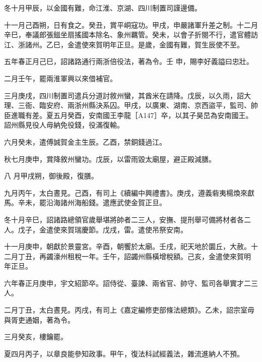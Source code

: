 \begin{pinyinscope}
 冬十月甲辰，以金國有難，命江淮、京湖、四川制置司謹邊備。



 十一月己酉朔，日有食之。癸丑，賞平峒寇功。甲戌，申嚴諸軍升差之制。十二月辛巳，奉議郎張鎡坐扇搖國本除名、象州羈管。癸未，以會子折閱不行，遣官體訪江、浙諸州。乙巳，金遣使來賀明年正旦。是歲，金國有難，賀生辰使不至。



 五年春正月己巳，詔諸路通行兩浙倍役法，著為令。壬
 申，賜李好義謚曰忠壯。



 二月壬午，罷兩淮軍興以來借補官。



 三月庚戌，四川制置司遣兵分道討敘州蠻，其酋米在請降。戊辰，以久雨，詔大理、三衙、臨安府、兩浙州縣決系囚。甲戌，以廣東、湖南、京西盜平，監司、帥臣進職有差。夏五月癸酉，安南國王李龍［A147］卒，以其子昊旵為安南國王。詔州縣見役人毋納免役錢，役滿復輸。



 六月癸未，遣傅誠賀金主生辰。乙酉，禁銅錢過江。



 秋七月庚申，賞降敘州蠻功。戊辰，以雷雨毀太廟屋，避正殿減膳。



 八
 月甲戌朔，御後殿，復膳。



 九月丙午，太白晝見。己酉，有司上《續編中興禮書》。庚戌，遵義砦夷楊煥來獻馬。辛未，罷沿海諸州海船錢。遣應武使金賀正旦。



 冬十月辛巳，詔諸路總領官歲舉堪將帥者二三人，安撫、提刑舉可備將材者各二人。戊子，金遣使來賀瑞慶節。戊戌，雷。遣使吊祭安南。



 十一月庚申，朝獻於景靈宮。辛酉，朝饗於太廟。壬戌，祀天地於圜丘，大赦。十二月丁丑，再蠲濠州租稅一年。壬午，詔蠲州縣橫增稅額。己亥，金遣使來賀明
 年正旦。



 六年春正月庚申，宇文紹節卒。詔侍從、臺諫、兩省官、帥守、監司各舉實才二三人。



 二月丁丑，太白晝見。丙戌，有司上《嘉定編修吏部條法總類》。乙未，詔宗室毋與胥吏通姻，著為令。



 三月癸亥，樓鑰罷。



 夏四月丙子，以章良能參知政事。甲午，復法科試經義法，雜流進納人不預。




\end{pinyinscope}
